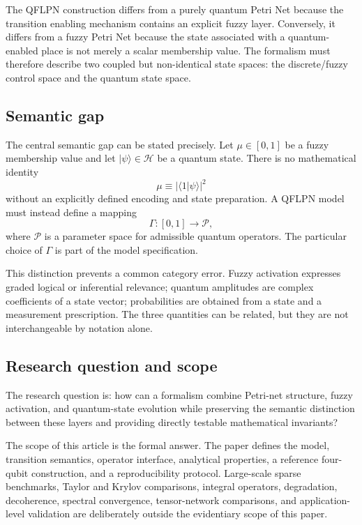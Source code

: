 \documentclass[final,3p,times]{elsarticle}
\begin{document}
The QFLPN construction differs from a purely quantum Petri Net because the transition enabling mechanism contains an explicit fuzzy layer. Conversely, it differs from a fuzzy Petri Net because the state associated with a quantum-enabled place is not merely a scalar membership value. The formalism must therefore describe two coupled but non-identical state spaces: the discrete/fuzzy control space and the quantum state space.

\subsection{Semantic gap}

The central semantic gap can be stated precisely. Let $\mu\in[0,1]$ be a fuzzy membership value and let $|\psi\rangle\in\mathcal{H}$ be a quantum state. There is no mathematical identity
\begin{equation}
    \mu \equiv |\langle 1|\psi\rangle|^2
\end{equation}
without an explicitly defined encoding and state preparation. A QFLPN model must instead define a mapping
\begin{equation}
    \Gamma:[0,1]\rightarrow\mathcal{P},
\end{equation}
where $\mathcal{P}$ is a parameter space for admissible quantum operators. The particular choice of $\Gamma$ is part of the model specification.

This distinction prevents a common category error. Fuzzy activation expresses graded logical or inferential relevance; quantum amplitudes are complex coefficients of a state vector; probabilities are obtained from a state and a measurement prescription. The three quantities can be related, but they are not interchangeable by notation alone.

\subsection{Research question and scope}

The research question is: how can a formalism combine Petri-net structure, fuzzy activation, and quantum-state evolution while preserving the semantic distinction between these layers and providing directly testable mathematical invariants?

The scope of this article is the formal answer. The paper defines the model, transition semantics, operator interface, analytical properties, a reference four-qubit construction, and a reproducibility protocol. Large-scale sparse benchmarks, Taylor and Krylov comparisons, integral operators, degradation, decoherence, spectral convergence, tensor-network comparisons, and application-level validation are deliberately outside the evidentiary scope of this paper.
\end{document}
